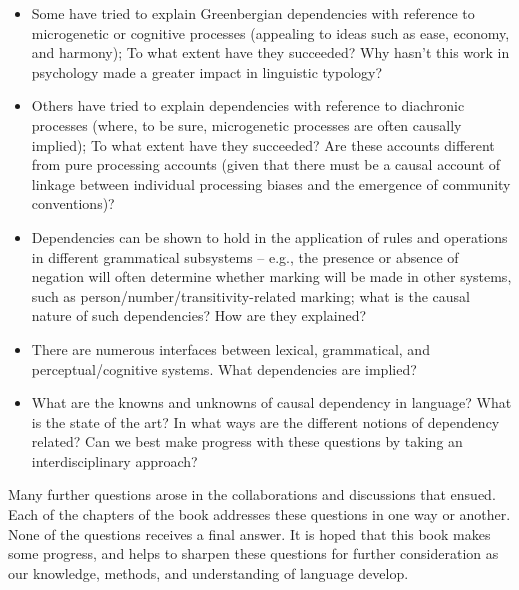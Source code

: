 \documentclass[output=paper]{langsci/langscibook}
\begin{document}
\begin{itemize}
\item Some have tried to explain Greenbergian dependencies with reference to microgenetic or cognitive processes (appealing to ideas such as ease, economy, and harmony); To what extent have they succeeded? Why hasn’t this work in psychology made a greater impact in linguistic typology?

\item Others have tried to explain dependencies with reference to diachronic processes (where, to be sure, microgenetic processes are often causally implied); To what extent have they succeeded? Are these accounts different from pure processing accounts (given that there must be a causal account of linkage between individual processing biases and the emergence of community conventions)?

\item Dependencies can be shown to hold in the application of rules and operations in different grammatical subsystems -- e.g., the presence or absence of negation will often determine whether marking will be made in other systems, such as person/number/transitivity-related marking; what is the causal nature of such dependencies? How are they explained?

\item There are numerous interfaces between lexical, grammatical, and perceptual/cognitive systems. What dependencies are implied?

\item What are the knowns and unknowns of causal dependency in language? What is the state of the art? In what ways are the different notions of dependency related? Can we best make progress with these questions by taking an interdisciplinary approach?
\end{itemize}

Many further questions arose in the collaborations and discussions that ensued. Each of the chapters of the book addresses these questions in one way or another. None of the questions receives a final answer. It is hoped that this book makes some progress, and helps to sharpen these questions for further consideration as our knowledge, methods, and understanding of language develop.

{\sloppy
\printbibliography[heading=subbibliography,notkeyword=this]
}
\end{document}
